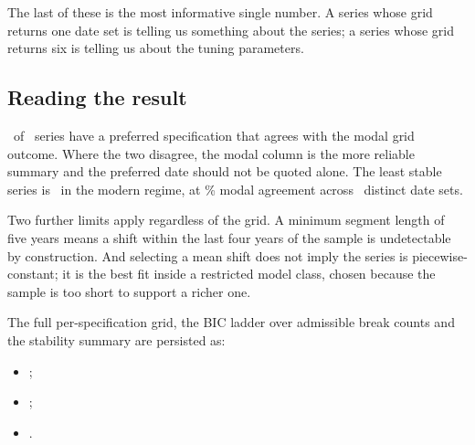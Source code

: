 The last of these is the most informative single number. A series whose grid returns
one date set is telling us something about the series; a series whose grid returns
six is telling us about the tuning parameters.

\subsection{Reading the result}

\BreakModalAgree\ of \BreakSeries\ series have a preferred specification that agrees
with the modal grid outcome. Where the two disagree, the modal column is the more
reliable summary and the preferred date should not be quoted alone. The least stable
series is \WeakestBreakSector\ in the modern regime, at
\WeakestBreakShare\% modal agreement across \WeakestBreakSets\ distinct date sets.

Two further limits apply regardless of the grid. A minimum segment length of five
years means a shift within the last four years of the sample is undetectable by
construction. And selecting a mean shift does not imply the series is
piecewise-constant; it is the best fit inside a restricted model class, chosen
because the sample is too short to support a richer one.

The full per-specification grid, the BIC ladder over admissible break counts and the
stability summary are persisted as:

\begin{itemize}
\item {};
\item {};
\item {}.
\end{itemize}
